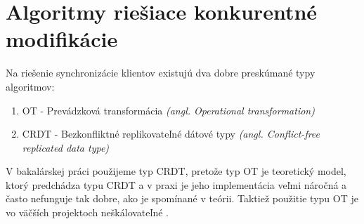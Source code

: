 \section{Algoritmy riešiace konkurentné modifikácie}
Na riešenie synchronizácie klientov existujú dva dobre preskúmané typy algoritmov:
\begin{enumerate}
  \item OT - Prevádzková transformácia \textit{(angl. Operational transformation)}
  \item CRDT - Bezkonfliktné replikovateľné dátové typy 
  \textit{(angl. Conflict-free replicated data type)}
\end{enumerate}

V bakalárskej práci použijeme typ CRDT, pretože typ OT je teoretický model, ktorý predchádza typu CRDT a v praxi
je jeho implementácia veľmi náročná a často nefunguje tak dobre, ako je spomínané v teórii.
Taktiež použitie typu OT je vo väčších projektoch neškálovateľné \cite{ot_nonscalable}.
